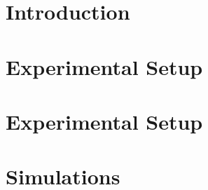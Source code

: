 \documentclass[12pt,twoside]{mitthesis}
\begin{document}

% 
\pagestyle{plain}
\tableofcontents
{}




\chapter{Introduction} \label{Chapter:Intro}


\chapter{Experimental Setup} \label{Chapter:Experiment}


\chapter{Experimental Setup} \label{Chapter:Simulations}


\chapter{Simulations} \label{Chapter:Simulations}

\end{document}
